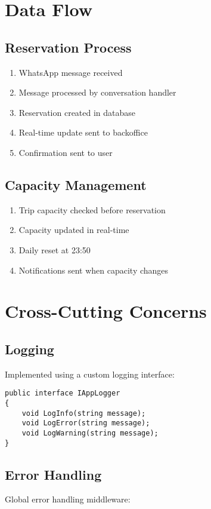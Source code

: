 \section{Data Flow}

\subsection{Reservation Process}
\begin{enumerate}
    \item WhatsApp message received
    \item Message processed by conversation handler
    \item Reservation created in database
    \item Real-time update sent to backoffice
    \item Confirmation sent to user
\end{enumerate}

\subsection{Capacity Management}
\begin{enumerate}
    \item Trip capacity checked before reservation
    \item Capacity updated in real-time
    \item Daily reset at 23:50
    \item Notifications sent when capacity changes
\end{enumerate}

\section{Cross-Cutting Concerns}

\subsection{Logging}
Implemented using a custom logging interface:

\begin{lstlisting}[language=CSharp]
public interface IAppLogger
{
    void LogInfo(string message);
    void LogError(string message);
    void LogWarning(string message);
}
\end{lstlisting}

\subsection{Error Handling}
Global error handling middleware:

